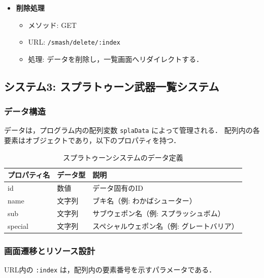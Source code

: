 \documentclass[uplatex,dvipdfmx]{jsarticle}
\begin{document}
\begin{itemize}
    \item \textbf{削除処理}
    \begin{itemize}
        \item メソッド: GET
        \item URL: \texttt{/smash/delete/:index}
        \item 処理: データを削除し，一覧画面へリダイレクトする．
    \end{itemize}
\end{itemize}

\subsection{システム3: スプラトゥーン武器一覧システム}

\subsubsection{データ構造}
データは，プログラム内の配列変数 \texttt{splaData} によって管理される．
配列内の各要素はオブジェクトであり，以下のプロパティを持つ．

\begin{table}[h]
    \centering
    \caption{スプラトゥーンシステムのデータ定義}
    \begin{tabular}{|l|l|l|}
        \hline
        プロパティ名 & データ型 & 説明 \\
        \hline
        id & 数値 & データ固有のID \\
        name & 文字列 & ブキ名（例: わかばシューター） \\
        sub & 文字列 & サブウェポン名（例: スプラッシュボム） \\
        special & 文字列 & スペシャルウェポン名（例: グレートバリア） \\
        \hline
    \end{tabular}
\end{table}

\subsubsection{画面遷移とリソース設計}
URL内の \texttt{:index} は，配列内の要素番号を示すパラメータである．
\end{document}

